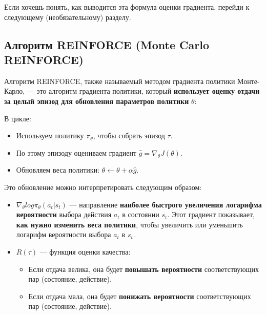 \documentclass[11pt,a4paper]{article}
\begin{document}

Если хочешь понять, как выводится эта формула оценки градиента, перейди к следующему (необязательному) разделу.

\subsection{Алгоритм REINFORCE (Monte Carlo REINFORCE)}\label{the-reinforce-algorithm-monte-carlo-reinforce}

Алгоритм REINFORCE, также называемый методом градиента политики Монте-Карло, --- это алгоритм градиента политики, который \textbf{использует оценку отдачи за целый эпизод для обновления параметров политики} \(\theta\):

В цикле:

\begin{itemize}
\tightlist
\item
  Используем политику \(\pi_\theta\), чтобы собрать эпизод \(\tau\).
\item
  По этому эпизоду оцениваем градиент \(\hat{g} = \nabla_\theta J(\theta)\).
\end{itemize}


\begin{itemize}
\tightlist
\item
  Обновляем веса политики: \(\theta \leftarrow \theta + \alpha \hat{g}\).
\end{itemize}

Это обновление можно интерпретировать следующим образом:

\begin{itemize}
\item
  \(\nabla_\theta log \pi_\theta(a_t|s_t)\) --- направление \textbf{наиболее быстрого увеличения логарифма вероятности} выбора действия \(a_t\) в состоянии \(s_t\). Этот градиент показывает, \textbf{как нужно изменить веса политики}, чтобы увеличить или уменьшить логарифм вероятности выбора \(a_t\) в \(s_t\).
\item
  \(R(\tau)\) --- функция оценки качества:

  \begin{itemize}
  \tightlist
  \item
    Если отдача велика, она будет \textbf{повышать вероятности} соответствующих пар (состояние, действие).
  \item
    Если отдача мала, она будет \textbf{понижать вероятности} соответствующих пар (состояние, действие).
  \end{itemize}
\end{itemize}
\end{document}
